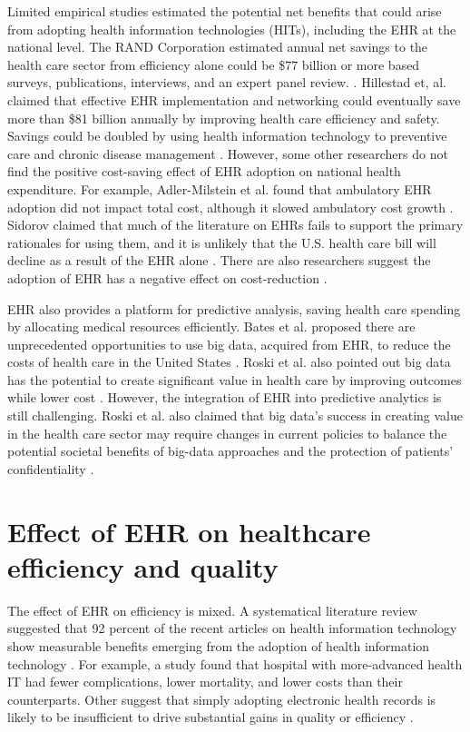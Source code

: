 \documentclass[12pt]{report}
\begin{document}
Limited empirical studies estimated the potential net benefits that could arise from adopting health information technologies (HITs), including the EHR at the national level. The RAND Corporation estimated annual net savings to the health care sector from efficiency alone could be \$77 billion or more based surveys, publications, interviews, and an expert panel review. \citep{Rand2005}. Hillestad et, al. claimed that effective EHR implementation and networking could eventually save more than \$81 billion annually by improving health care efficiency and safety. Savings could be doubled by using health information technology to preventive care and chronic disease management \citep{Hillestad2005}. However, some other researchers do not find the positive cost-saving effect of EHR adoption on national health expenditure. For example, Adler-Milstein et al. found that ambulatory EHR adoption did not impact total cost, although it slowed ambulatory cost growth \citep{Adler-Milstein2013}. Sidorov claimed that much of the literature on EHRs fails to support the primary rationales for using them, and it is unlikely that the U.S. health care bill will decline as a result of the EHR alone \citep{Sidorov2006}. There are also researchers suggest the adoption of EHR has a negative effect on cost-reduction  \citep{Teufel2012}.

EHR also provides a platform for predictive analysis, saving health care spending by allocating medical resources efficiently. Bates et al. proposed there are unprecedented opportunities to use big data, acquired from EHR, to reduce the costs of health care in the United States \citep{Bates2014}. Roski et al. also pointed out big data has the potential to create significant value in health care by improving outcomes while lower cost \citep{Roski2014}. However, the integration of EHR into predictive analytics is still challenging. Roski et al. also claimed that big data's success in creating value in the health care sector may require changes in current policies to balance the potential societal benefits of big-data approaches and the protection of patients' confidentiality \citep{Roski2014}.

\section{Effect of EHR on healthcare efficiency and quality}

The effect of EHR on efficiency is mixed. A systematical literature review suggested that 92 percent of the recent articles on health information technology show measurable benefits emerging from the adoption of health information technology \citep{Buntin2011}. For example, a study found that hospital with more-advanced health IT had fewer complications, lower mortality, and lower costs than their counterparts\citep{amarasingham2009clinical}. Other suggest that simply adopting electronic health records is likely to be insufficient to drive substantial gains in quality or efficiency \citep{DesRoches2010}. 
\end{document}
